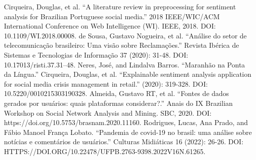 \documentclass[conference]{IEEEtran}
\begin{document}
\begin{thebibliography}{00}
 Cirqueira, Douglas, et al. ``A literature review in preprocessing for sentiment analysis for Brazilian Portuguese social media.'' 2018 IEEE/WIC/ACM International Conference on Web Intelligence (WI). IEEE, 2018. DOI: 10.1109/WI.2018.00008.
 de Sousa, Gustavo Nogueira, et al. ``Análise do setor de telecomunicação brasileiro: Uma visão sobre Reclamações.'' Revista Ibérica de Sistemas e Tecnologias de Informação 37 (2020): 31-48. DOI: 10.17013/risti.37.31–48.
 Neres, José, and Lindalva Barros. ``Maranhão na Ponta da Língua.''
 Cirqueira, Douglas, et al. ``Explainable sentiment analysis application for social media crisis management in retail.'' (2020): 319-328. DOI: 10.5220/0010215303190328.
 Almeida, Gustavo RT, et al. ``Fontes de dados gerados por usuários: quais plataformas considerar?.'' Anais do IX Brazilian Workshop on Social Network Analysis and Mining. SBC, 2020. DOI: https://doi.org/10.5753/brasnam.2020.11160.
 Rodrigues, Lucas, Ana Prado, and Fábio Manoel França Lobato. ``Pandemia de covid-19 no brasil: uma análise sobre notícias e comentários de usuários.'' Culturas Midiáticas 16 (2022): 26-26. DOI: HTTPS://DOI.ORG/10.22478/UFPB.2763-9398.2022V16N.61265.
\end{thebibliography}
\end{document}
